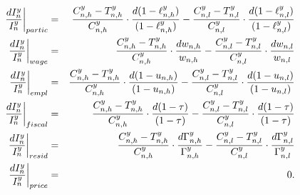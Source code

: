 \documentclass[a4paper,12pt]{article}
\begin{document}
\begin{eqnarray*}
\left. \frac{dI_{n}^{y}}{I_{n}^{y}}\right \vert _{partic} &=&\frac{%
C_{n,h}^{y}-T_{n,h}^{y}}{C_{n,h}^{y}}\cdot \frac{d(1-\ell _{n,h}^{y})}{%
(1-\ell _{n,h}^{y})}-\frac{C_{n,l}^{y}-T_{n,l}^{y}}{C_{n,l}^{y}}\cdot \frac{%
d(1-\ell _{n,l}^{y})}{(1-\ell _{n,l}^{y})} \\
\left. \frac{dI_{n}^{y}}{I_{n}^{y}}\right \vert _{wage} &=&\frac{%
C_{n,h}^{y}-T_{n,h}^{y}}{C_{n,h}^{y}}\cdot \frac{dw_{n,h}}{w_{n,h}}-\frac{%
C_{n,l}^{y}-T_{n,l}^{y}}{C_{n,l}^{y}}\cdot \frac{dw_{n,l}}{w_{n,l}} \\
\left. \frac{dI_{n}^{y}}{I_{n}^{y}}\right \vert _{empl} &=&\frac{%
C_{n,h}^{y}-T_{n,h}^{y}}{C_{n,h}^{y}}\cdot \frac{d(1-u_{n,h})}{(1-u_{n,h})}-%
\frac{C_{n,l}^{y}-T_{n,l}^{y}}{C_{n,l}^{y}}\cdot \frac{d(1-u_{n,l})}{%
(1-u_{n,l})} \\
\left. \frac{dI_{n}^{y}}{I_{n}^{y}}\right \vert _{fiscal} &=&\frac{%
C_{n,h}^{y}-T_{n,h}^{y}}{C_{n,h}^{y}}\cdot \frac{d(1-\tau )}{(1-\tau )}-%
\frac{C_{n,l}^{y}-T_{n,l}^{y}}{C_{n,l}^{y}}\cdot \frac{d(1-\tau )}{(1-\tau )}
\\
\left. \frac{dI_{n}^{y}}{I_{n}^{y}}\right \vert _{resid} &=&\frac{%
C_{n,h}^{y}-T_{n,h}^{y}}{C_{n,h}^{y}}\cdot \frac{d\Gamma _{n,h}^{y}}{\Gamma
_{n,h}^{y}}-\frac{C_{n,l}^{y}-T_{n,l}^{y}}{C_{n,l}^{y}}\cdot \frac{d\Gamma
_{n,l}^{y}}{\Gamma _{n,l}^{y}} \\
\left. \frac{dI_{n}^{y}}{I_{n}^{y}}\right \vert _{price} &=&0.
\end{eqnarray*}
\end{document}
